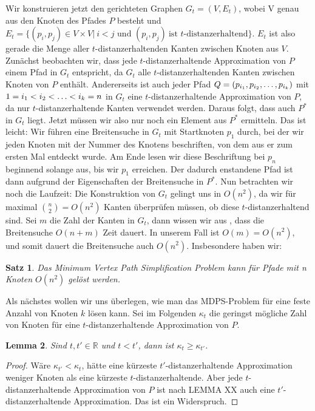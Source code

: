 \documentclass[11pt]{article}
\newcommand{\R}{\mathbb{R}}
\newtheorem{theorem}{Satz}[section]
\newtheorem{lemma}[theorem]{Lemma}
\begin{document}
    Wir konstruieren jetzt den gerichteten Graphen $G_t = (V,E_t)$, wobei V genau aus den Knoten des Pfades $P$ besteht und 
    $E_t = \{(p_i, p_j) \in V\times V|\ i < j \text{ und } (p_i,p_j)\ \text{ist $t$-distanzerhaltend}\}$. $E_t$ ist also gerade die Menge aller $t$-distanzerhaltenden Kanten zwischen Knoten aus $V$. Zunächst beobachten wir, dass jede $t$-distanzerhaltende Approximation von $P$ einem Pfad in $G_t$ entspricht, da $G_t$ alle $t$-distanzerhaltenden Kanten zwischen Knoten von $P$ enthält. Andererseits ist auch jeder Pfad $Q = (p_{i_1}, p_{i_2}, \mathellipsis, p_{i_k})$ mit $1 = i_1 < i_2 < \mathellipsis < i_k = n$ in $G_t$ eine $t$-distanzerhaltende Approximation von $P$, da nur $t$-distanzerhaltende Kanten verwendet werden. Daraus folgt, dass auch $P^*$ in $G_t$ liegt. Jetzt müssen wir also nur noch ein Element aus $P^*$ ermitteln. Das ist leicht: Wir führen eine Breitensuche in $G_t$ mit Startknoten $p_1$ durch, bei der wir jeden Knoten mit der Nummer des Knotens beschriften, von dem aus er zum ersten Mal entdeckt wurde. Am Ende lesen wir diese Beschriftung bei $p_n$ beginnend solange aus, bis wir $p_1$ erreichen. Der dadurch enstandene Pfad ist dann aufgrund der Eigenschaften der Breitensuche in $P^*$. 
    Nun betrachten wir noch die Laufzeit: Die Konstruktion von $G_t$ gelingt uns in $O(n^2)$, da wir für maximal $\binom{n}{2} = O(n^2)$ Kanten überprüfen müssen, ob diese $t$-distanzerhaltend sind. Sei $m$ die Zahl der Kanten in $G_t$, dann wissen wir aus  \cite{hagerup}, dass die Breitensuche $O(n+m)$ Zeit dauert. In unserem Fall ist $O(m) = O(n^2)$, und somit dauert die Breitensuche auch $O(n^2)$. Insbesondere haben wir:
    \begin{theorem}
    	\label{theo:mvpsex}
    	Das Minimum Vertex Path Simplification Problem kann für Pfade mit n Knoten $O(n^2)$ gelöst werden.
    \end{theorem} 
    
    Als nächstes wollen wir uns überlegen, wie man das MDPS-Problem für eine feste Anzahl von Knoten $k$ lösen kann. Sei im Folgenden $\kappa_t$ die geringst mögliche Zahl von Knoten für eine $t$-distanzerhaltende Approximation von $P$.
	\begin{lemma}
		\label{lem:kappa}
		Sind $t, t' \in \R$ und $t < t'$, dann ist $\kappa_t \geq \kappa_{t'}$.
	\end{lemma}
	\begin{proof}
		Wäre $\kappa_{t'} < \kappa_t$, hätte eine kürzeste $t'$-distanzerhaltende Approximation weniger Knoten als eine kürzeste $t$-distanzerhaltende. Aber jede $t$-distanzerhaltende Approximation von $P$ ist nach LEMMA XX auch eine $t'$-distanzerhaltende Approximation. Das ist ein Widerspruch. 
	\end{proof}
	
\end{document}
